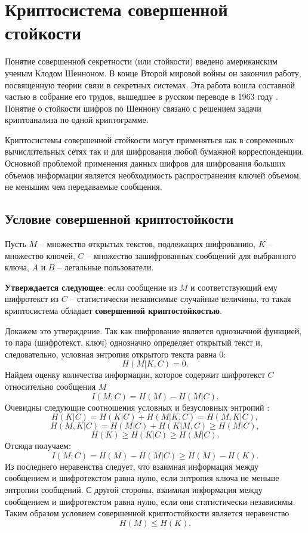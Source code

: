 \section[Криптосистема совершенной стойкости]{Криптосистема совершенной \protect\\ стойкости}

Понятие совершенной секретности (или стойкости) введено американским ученым Клодом Шенноном. В конце Второй мировой войны он закончил работу, посвященную теории связи в секретных системах\cite{Shannon:1949:CTS}. Эта работа вошла составной частью в собрание его трудов, вышедшее в русском переводе в 1963 году \cite{Shannon:1963}. Понятие о стойкости шифров по Шеннону связано с решением задачи криптоанализа по одной криптограмме.

Криптосистемы совершенной стойкости могут применяться как в современных вычислительных сетях так и для шифрования любой бумажной корреспонденции. Основной проблемой применения данных шифров для шифрования больших объемов информации является необходимость распространения ключей объемом, не меньшим чем передаваемые сообщения.

\subsection{Условие совершенной криптостойкости}


Пусть $M$ -- множество открытых текстов, подлежащих шифрованию, $K$ -- множество ключей, $C$ -- множество зашифрованных сообщений для выбранного ключа, $A$ и $B$ -- легальные пользователи.

\textbf{Утверждается следующее}: если сообщение из $M$ и соответствующий ему шифротекст из $C$ -- статистически независимые случайные величины, то такая криптосистема обладает \textbf{совершенной криптостойкостью}.

Докажем это утверждение. Так как шифрование является однозначной функцией, то пара (шифротекст, ключ) однозначно определяет открытый текст и, следовательно, условная энтропия открытого текста равна 0:
\[H(M|K,C)=0.\]
Найдем оценку количества информации, которое содержит шифротекст $C$ относительно сообщения  $M$
\[ I(M; C) = H(M) - H(M | C). \]
Очевидны следующие соотношения условных и безусловных энтропий \cite{GabPil:2007}:
\[H(K|C)=H(K|C)+H(M|K,C)=H(M,K|C),\]
\[H(M,K|C)=H(M|C)+H(K|M,C)\geq H(M|C),\]
\[H(K)\geq H(K|C)\geq H(M|C).\]
Отсюда получаем:
 \[ I(M; C) = H(M) - H(M | C)\geq H(M)-H(K). \]
Из последнего неравенства следует, что взаимная информация между сообщением и шифротекстом равна нулю, если энтропия ключа не меньше энтропии сообщений. С другой стороны, взаимная информация между сообщением и шифротекстом равна нулю, если они статистически независимы. Таким образом условием  совершенной криптостойкости является неравенство
\[ H(M) \leq  H(K).\]

